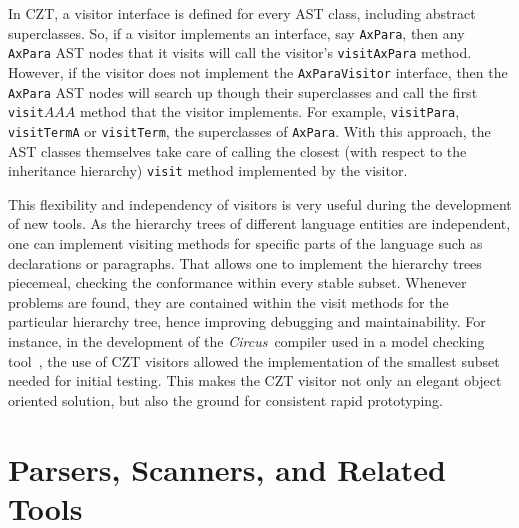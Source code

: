 \documentclass{llncs}
\newcommand{\Circus}{{\sf\slshape Circus}}
\newcommand{\Interface}[1]{\texttt{#1}}
\newcommand{\Method}[1]{\texttt{#1}}
\begin{document}
  In CZT, a visitor interface is defined for every AST class,
  including abstract superclasses.  So, if a visitor implements an
  interface, say \Interface{AxPara}, then any \Interface{AxPara} AST
  nodes that it visits will call the visitor's \Method{visitAxPara}
  method.  However, if the visitor does not implement the
  \Interface{AxParaVisitor} interface, then the \Interface{AxPara} AST
  nodes will search up though their superclasses and call the first
  \Method{visit$AAA$} method that the visitor implements. For example,
  \Interface{visitPara}, \Interface{visitTermA} or \Interface{visitTerm},
  the superclasses of \Interface{AxPara}.
  With this approach, the AST classes themselves take care of calling
  the closest (with respect to the inheritance hierarchy)
  \Method{visit} method implemented by the visitor.

  This flexibility and independency of visitors is very useful during
  the development of new tools.  As the hierarchy trees of different
  language entities are independent, one can implement visiting
  methods for specific parts of the language such as declarations or
  paragraphs.  That allows one to implement the hierarchy trees
  piecemeal, checking the conformance within every stable subset.
  Whenever problems are found, they are contained within the visit
  methods for the particular hierarchy tree, hence improving debugging
  and maintainability.  For instance, in the development of the
  \Circus\ compiler used in a model checking
  tool~\cite{circus.mc:leo}, the use of CZT visitors allowed the
  implementation of the smallest subset needed for initial testing.
  This makes the CZT visitor not only an elegant object oriented
  solution, but also the ground for consistent rapid prototyping.

\section{Parsers, Scanners, and Related Tools}
\label{parsers}
\end{document}
